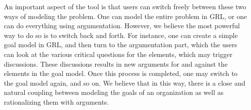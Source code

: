 An important aspect of the tool is that users can switch freely between these two ways of modeling the problem. One can model the entire problem in GRL, or one can do everything using argumentation. However, we believe the most powerful way to do so is to switch back and forth. For instance, one can create a simple goal model in GRL, and then turn to the argumentation part, which the users can look at the various critical questions for the elements, which may trigger discussions. These discussions results in new arguments for and against the elements in the goal model. Once this process is completed, one may switch to the goal model again, and so on. We believe that in this way, there is a close and natural coupling between modeling the goals of an organization as well as rationalizing them with arguments.